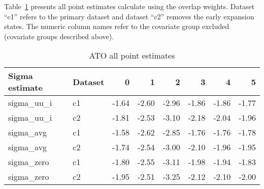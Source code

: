 Table~\ref{tab:ATOsensitive} presents all point estimates calculate using the overlap weights. Dataset ``c1'' refers to the primary dataset and dataset ``c2'' removes the early expansion states. The numeric column names refer to the covariate group excluded (covariate groups described above).

\begin{table}[ht]
\centering
\caption{ATO all point estimates}
\label{tab:ATOsensitive}
\begin{tabular}{llrrrrrr}
  \hline
Sigma estimate & Dataset & 0 & 1 & 2 & 3 & 4 & 5 \\ 
  \hline
sigma\_uu\_i & c1 & -1.64 & -2.60 & -2.96 & -1.86 & -1.86 & -1.77 \\ 
  sigma\_uu\_i & c2 & -1.81 & -2.53 & -3.10 & -2.18 & -2.04 & -1.96 \\ 
  sigma\_avg & c1 & -1.58 & -2.62 & -2.85 & -1.76 & -1.76 & -1.78 \\ 
  sigma\_avg & c2 & -1.74 & -2.54 & -3.00 & -2.10 & -1.96 & -1.95 \\ 
  sigma\_zero & c1 & -1.80 & -2.55 & -3.11 & -1.98 & -1.94 & -1.83 \\ 
  sigma\_zero & c2 & -1.95 & -2.51 & -3.25 & -2.12 & -2.10 & -2.00 \\ 
   \hline
\end{tabular}
\end{table}
